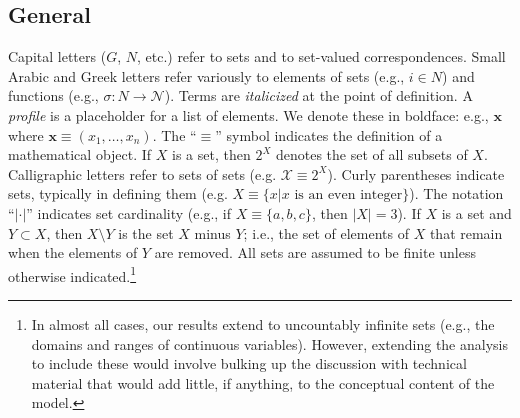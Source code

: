 \documentclass[
11pt,
titlepage,
reqno,
]{article}%
\theoremstyle{definition}
\begin{document}
	\subsection{General}
	Capital letters ($G$, $N$, etc.) refer to sets and to set-valued correspondences.  
	Small Arabic and Greek letters refer variously to elements of sets (e.g., $i\in N$) and functions (e.g., $\sigma:N\rightarrow \mathcal{N}$). 
	Terms  are \textit{italicized} at the point of definition.  
	A \textit{profile} is a placeholder for a list of elements.
	We denote these in boldface: e.g., $\mathbf{x}$ where $\mathbf{x}\equiv(x_1,\ldots,x_n)$. 
	The ``$\equiv$'' symbol indicates the definition of a mathematical object. 
	If $X$ is a set, then $2^X$ denotes the set of all subsets of $X$. Calligraphic letters refer to sets of sets (e.g. $\mathcal{X}\equiv 2^X$). 
	Curly parentheses indicate sets, typically in defining them (e.g. $X\equiv\{x|x\text{ is an even integer}\}$). 
	The notation ``$|\cdot|$'' indicates set cardinality (e.g., if $X\equiv\{a,b,c\}$, then $|X|=3$). 
	If $X$ is a set and $Y\subset X$, then $X\setminus Y$ is the set $X$ minus $Y$; i.e., the set of elements of $X$ that  remain when the elements of $Y$ are removed. 
	All sets are assumed to be finite unless otherwise indicated.\footnote
	{
		In almost all cases, our results extend to uncountably infinite sets (e.g., the domains and ranges of continuous variables). However, extending the analysis to include these would involve bulking up the discussion with technical material that would add little, if anything, to the conceptual content of the model.
	}
	
	
	\pagebreak
\end{document}
